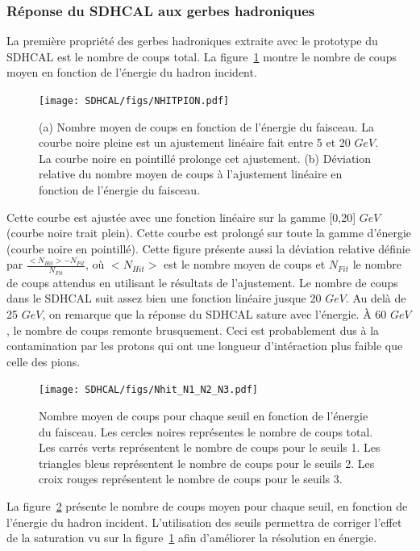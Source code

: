\subsubsection{Réponse du SDHCAL aux gerbes hadroniques}
La première propriété des gerbes hadroniques extraite avec le prototype du SDHCAL est le nombre de coups total. La figure~\ref{fig:nhitLin} montre le nombre de coups moyen en fonction de l'énergie du hadron incident.
\begin{figure}[!h]
  \begin{center}
    \texttt{[image: SDHCAL/figs/NHITPION.pdf]}
    \caption{(a) Nombre moyen de coups en fonction de l'énergie du faisceau. La courbe noire pleine est un ajustement linéaire fait entre 5 et 20 $GeV$. La courbe noire en pointillé prolonge cet ajustement. (b) Déviation relative du nombre moyen de coups à l'ajustement linéaire en fonction de l'énergie du faisceau.}
    \label{fig:nhitLin}
  \end{center}
\end{figure}
Cette courbe est ajustée avec une fonction linéaire sur la gamme [0,20] $GeV$ (courbe noire trait plein). Cette courbe est prolongé sur toute la gamme d'énergie (courbe noire en pointillé). Cette figure présente aussi la déviation relative définie par $\frac{<N_{Hit}>-N_{Fit}}{N_{Fit}}$, où $<N_{Hit}>$ est le nombre moyen de coups et $N_{Fit}$ le nombre de coups attendus en utilisant le résultats de l'ajustement. Le nombre de coups dans le SDHCAL suit assez bien une fonction linéaire jusque 20 $GeV$. Au delà de 25 $GeV$, on remarque que la réponse du SDHCAL sature avec l'énergie. À 60 $GeV$, le nombre de coups remonte brusquement. Ceci est probablement dus à la contamination par les protons qui ont une longueur d'intéraction plus faible que celle des pions.
\begin{figure}[!h]
  \begin{center}
    \texttt{[image: SDHCAL/figs/Nhit\_N1\_N2\_N3.pdf]}
    \caption{Nombre moyen de coups pour chaque seuil en fonction de l'énergie du faisceau. Les cercles noires représentes le nombre de coups total. Les carrés verts représentent le nombre de coups pour le seuils 1. Les triangles bleus représentent le nombre de coups pour le seuils 2. Les croix rouges représentent le nombre de coups pour le seuils 3.}
    \label{fig:nhit123}
  \end{center}
\end{figure}
La figure~\ref{fig:nhit123} présente le nombre de coups moyen pour chaque seuil, en fonction de l'énergie du hadron incident. L'utilisation des seuils permettra de corriger l'effet de la saturation vu sur la figure~\ref{fig:nhitLin} afin d'améliorer la résolution en énergie.

